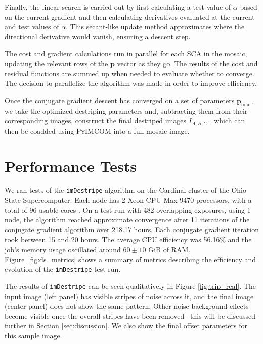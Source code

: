 \documentclass[]{pasj01}
\begin{document}
Finally, the linear search is carried out by first calculating a test value of $\alpha$ based on the current gradient and then
calculating derivatives evaluated at the current and test values of $\alpha$. This secant-like update method approximates where the directional derivative would vanish, ensuring a descent step. 

The cost and gradient calculations run in parallel for each SCA in the mosaic, updating the relevant rows of the ${\boldsymbol p}$ vector as they go. The results of the cost and residual functions are summed up when needed to evaluate whether to converge. The decision to parallelize the algorithm was made in order to improve efficiency.

Once the conjugate gradient descent has converged on a set of parameters ${\boldsymbol p}_{\text{final}}$, we take the optimized destriping parameters and, subtracting them from their corresponding images, construct the final destriped images $\tilde I_{A, B, C...}$ which can then be coadded using \textsc{PyIMCOM} \citep{Cao2025} into a full mosaic image.

\section{Performance Tests}\label{sec:performance}


We ran tests of the \texttt{imDestripe} algorithm on the Cardinal cluster of the Ohio State Supercomputer. Each node has 2 Xeon CPU Max 9470 processors, with a total of 96 usable cores \citep{OSC2024}. On a test run with 482 overlapping exposures, using 1 node, the algorithm reached approximate convergence after 11 iterations of the conjugate gradient algorithm over 218.17 hours. Each conjugate gradient iteration took between 15 and 20 hours. The average CPU efficiency was 56.16\% and the job's memory usage oscillated around $60\pm10$ GiB of RAM. Figure~\ref{fig:ds_metrics} shows a summary of metrics describing the efficiency and evolution of the \texttt{imDestripe} test run.

The results of \texttt{imDestripe} can be seen qualitatively in Figure \ref{fig:trip_real}. The input image (left panel) has visible stripes of noise across it, and the final image (center panel) does not show the same pattern. Other noise background effects become visible once the overall stripes have been removed-- this will be discussed further in Section \ref{sec:discussion}. We also show the final offset parameters for this sample image.
\end{document}
